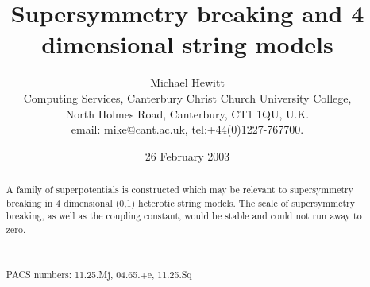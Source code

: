 \documentclass[a4paper,12pt]{article}
\begin{document}
\title{Supersymmetry breaking and 4 dimensional string models}
\author{Michael Hewitt \\
Computing Services, Canterbury Christ Church University College,\\
North Holmes Road, Canterbury, CT1 1QU, U.K. \\ email:
mike@cant.ac.uk,
 tel:+44(0)1227-767700.}
\date{26 February 2003}
\maketitle
\begin{abstract}

A family of superpotentials is constructed which may be relevant
to supersymmetry breaking in 4 dimensional (0,1) heterotic string
models. The scale of supersymmetry breaking, as well as the
coupling constant, would be stable and could not run away to
zero.\

\


PACS numbers:  11.25.Mj, 04.65.+e, 11.25.Sq


\end{abstract}
\end{document}
